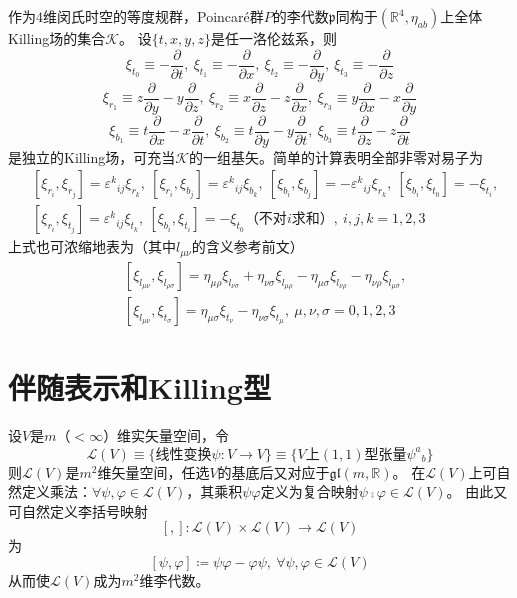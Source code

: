 \begin{example}
    作为$4$维闵氏时空的等度规群，Poincaré群$P$的李代数$\mathfrak{p}$同构于$(\mathbb{R}^4, \eta_{ab})$上全体Killing场的集合$\mathscr{K}$。
    设$\{t, x, y, z\}$是任一洛伦兹系，则
    $$\xi_{t_0} \equiv -\frac{\partial}{\partial t}, ~ \xi_{t_1} \equiv -\frac{\partial}{\partial x}, ~ \xi_{t_2} \equiv -\frac{\partial}{\partial y}, ~ \xi_{t_3} \equiv -\frac{\partial}{\partial z}$$
    $$\xi_{r_1} \equiv z\frac{\partial}{\partial y} - y\frac{\partial}{\partial z}, ~ \xi_{r_2} \equiv x\frac{\partial}{\partial z} - z\frac{\partial}{\partial x}, ~ \xi_{r_3} \equiv y\frac{\partial}{\partial x} - x\frac{\partial}{\partial y}$$
    $$\xi_{b_1} \equiv t\frac{\partial}{\partial x} - x\frac{\partial}{\partial t}, ~ \xi_{b_2} \equiv t\frac{\partial}{\partial y} - y\frac{\partial}{\partial t}, ~ \xi_{b_3} \equiv t\frac{\partial}{\partial z} - z\frac{\partial}{\partial t}$$
    是独立的Killing场，可充当$\mathscr{K}$的一组基矢。简单的计算表明全部非零对易子为
    \[\begin{split}
        & [\xi_{r_i}, \xi_{r_j}] = \varepsilon^k{}_{ij}\xi_{r_k}, ~ [\xi_{r_i}, \xi_{b_j}] = \varepsilon^k{}_{ij}\xi_{b_k}, ~ [\xi_{b_i}, \xi_{b_j}] = -\varepsilon^k{}_{ij}\xi_{r_k}, ~ [\xi_{b_i}, \xi_{t_0}] = -\xi_{t_i}, \\
        & [\xi_{r_i}, \xi_{t_j}] = \varepsilon^k{}_{ij}\xi_{t_k}, ~ [\xi_{b_i}, \xi_{t_i}] = -\xi_{t_0} \text{（不对$i$求和）}, ~ i, j, k = 1, 2, 3
    \end{split}\]
    上式也可浓缩地表为（其中$l_{\mu\nu}$的含义参考前文）
    \[\begin{split}
        & [\xi_{l_{\mu\nu}}, \xi_{l_{\rho\sigma}}] = \eta_{\mu\rho}\xi_{l_{\nu\sigma}} + \eta_{\nu\sigma}\xi_{l_{\mu\rho}} - \eta_{\mu\sigma}\xi_{l_{\nu\rho}} - \eta_{\nu\rho}\xi_{l_{\mu\sigma}}, \\
        & [\xi_{l_{\mu\nu}}, \xi_{t_\sigma}] = \eta_{\mu\sigma}\xi_{t_\nu} - \eta_{\nu\sigma}\xi_{t_\mu}, ~ \mu, \nu, \sigma = 0, 1, 2, 3
    \end{split}\]
\end{example}

\section{伴随表示和Killing型}

设$V$是$m$（$< \infty$）维实矢量空间，令
$$\mathscr{L}(V) \equiv \{\text{线性变换}\psi \colon V \to V\} \equiv \{V\text{上}(1, 1)\text{型张量}\psi^a{}_b\}$$
则$\mathscr{L}(V)$是$m^2$维矢量空间，任选$V$的基底后又对应于$\mathfrak{gl}(m, \mathbb{R})$。
在$\mathscr{L}(V)$上可自然定义乘法：$\forall \psi, \varphi \in \mathscr{L}(V)$，其乘积$\psi\varphi$定义为复合映射$\psi\comp\varphi \in \mathscr{L}(V)$。
由此又可自然定义李括号映射
$$[,] \colon \mathscr{L}(V) \times \mathscr{L}(V) \to \mathscr{L}(V)$$
为
$$[\psi, \varphi] \coloneq \psi\varphi - \varphi\psi, ~ \forall \psi, \varphi \in \mathscr{L}(V)$$
从而使$\mathscr{L}(V)$成为$m^2$维李代数。

